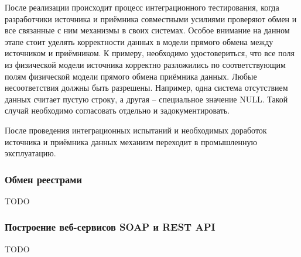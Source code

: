 После реализации происходит процесс интеграционного тестирования, когда разработчики источника и приёмника совместными усилиями проверяют обмен и все связанные с ним механизмы в своих системах.
Особое внимание на данном этапе стоит уделять корректности данных в модели прямого обмена между источником и приёмником.
К примеру, необходимо удостовериться, что все поля из физической модели источника корректно разложились по соответствующим полям физической модели прямого обмена приёмника данных.
Любые несоответствия должны быть разрешены.
Например, одна система отсутствием данных считает пустую строку, а другая -- специальное значение NULL.
Такой случай необходимо согласовать отдельно и задокументировать.

После проведения интеграционных испытаний и необходимых доработок источника и приёмника данных механизм переходит в промышленную эксплуатацию.

\subsubsection{Обмен реестрами}

TODO

\subsubsection{Построение веб-сервисов SOAP и REST API}

TODO

\clearpage
\newpage